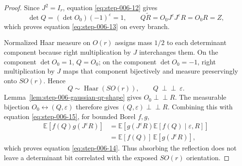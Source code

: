 \begin{proof}
Since \(J^2=I_r\), equation \eqref{eq:step-006-12} gives
\[
  \det Q=(\det O_0)(-1)^{\varepsilon}=1,
  \qquad
  Q\widetilde R=O_0J^{\varepsilon}J^{\varepsilon}R=O_0R=Z,
\]
which proves equation \eqref{eq:step-006-13} on every branch.

Normalized Haar measure on \(O(r)\) assigns mass \(1/2\) to each determinant
component because right multiplication by \(J\) interchanges them. On the
component \(\det O_0=1\), \(Q=O_0\); on the component \(\det O_0=-1\), right
multiplication by \(J\) maps that component bijectively and measure
preservingly onto \(SO(r)\). Hence
\begin{equation}
  Q\sim\operatorname{Haar}(SO(r)),\qquad
  Q\ \perp\!\!\!\perp\ \varepsilon.                         \label{eq:step-006-15}
\end{equation}
Lemma~\ref{lem:step-006-gaussian-qr-shape} gives
\(O_0\perp\!\!\!\perp R\). The measurable bijection
\(O_0\leftrightarrow(Q,\varepsilon)\) therefore gives
\((Q,\varepsilon)\perp\!\!\!\perp R\). Combining this with equation \eqref{eq:step-006-15},
for bounded Borel \(f,g\),
\[
\begin{aligned}
  \mathbb E[f(Q)g(J^{\varepsilon}R)]
  &=\mathbb E\!\left[g(J^{\varepsilon}R)
      \mathbb E[f(Q)\mid\varepsilon,R]\right]\\
  &=\mathbb E[f(Q)]\,\mathbb E[g(J^{\varepsilon}R)],
\end{aligned}
\]
which proves equation \eqref{eq:step-006-14}. Thus absorbing the reflection does not leave a
determinant bit correlated with the exposed \(SO(r)\) orientation.


\end{proof}


